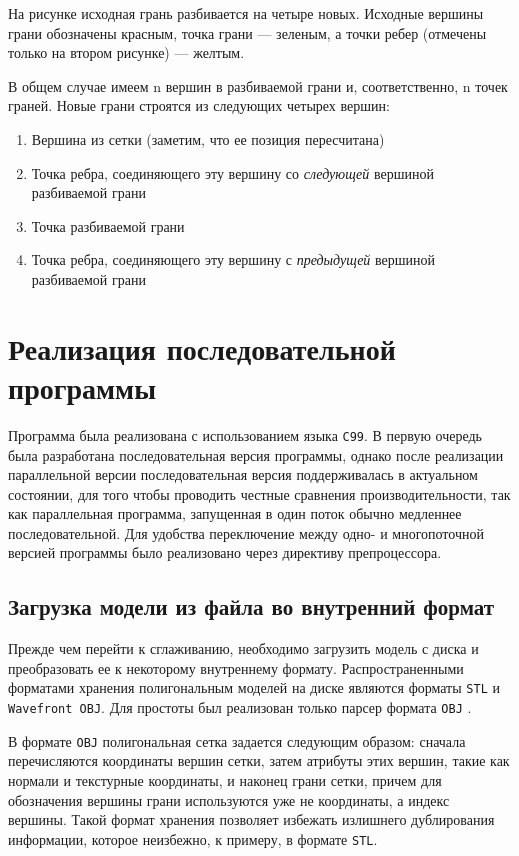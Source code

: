 \documentclass[14pt]{extarticle}
\begin{document}
На рисунке исходная грань разбивается на четыре новых. Исходные вершины грани обозначены красным, точка грани --- зеленым, а точки ребер (отмечены только на втором рисунке) --- желтым. 

В общем случае имеем n вершин в разбиваемой грани и, соответственно, n точек граней. Новые грани строятся из следующих четырех вершин:
\begin{enumerate}
\item Вершина из сетки (заметим, что ее позиция пересчитана)
\item Точка ребра, соединяющего эту вершину со \emph{следующей} вершиной разбиваемой грани
\item Точка разбиваемой грани
\item Точка ребра, соединяющего эту вершину с \emph{предыдущей} вершиной разбиваемой грани
\end{enumerate}

\newpage
\section{Реализация последовательной программы}
Программа была реализована с использованием языка \texttt{C99}. В первую очередь была разработана последовательная версия программы, однако после реализации параллельной версии последовательная версия поддерживалась в актуальном состоянии, для того чтобы проводить честные сравнения производительности, так как параллельная программа, запущенная в один поток обычно медленнее последовательной. Для удобства переключение между одно- и многопоточной версией программы было реализовано через директиву препроцессора.

\subsection{Загрузка модели из файла во внутренний формат}
Прежде чем перейти к сглаживанию, необходимо загрузить модель с диска и преобразовать ее к некоторому внутреннему формату. Распространенными форматами хранения полигональным моделей на диске являются форматы \texttt{STL} и \texttt{Wavefront OBJ}. Для простоты был реализован только парсер формата \texttt{OBJ} \cite{objWWW}.

В формате \texttt{OBJ} полигональная сетка задается следующим образом: сначала перечисляются координаты вершин сетки, затем атрибуты этих вершин, такие как нормали и текстурные координаты, и наконец грани сетки, причем для обозначения вершины грани используются уже не координаты, а индекс вершины. Такой формат хранения позволяет избежать излишнего дублирования информации, которое неизбежно, к примеру, в формате \texttt{STL}. 
\end{document}
